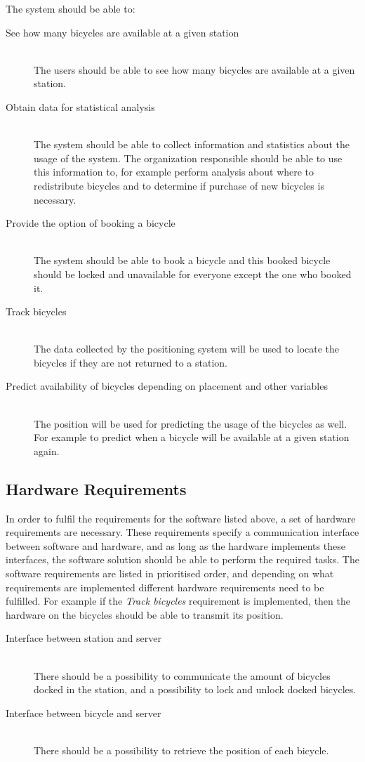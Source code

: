The system should be able to:
\begin{description}
\item[See how many bicycles are available at a given station] \hfill \\
The users should be able to see how many bicycles are available at a given station.
\item[Obtain data for statistical analysis] \hfill \\
The system should be able to collect information and statistics about the usage of the system.
The organization responsible should be able to use this information to, for example perform analysis about where to redistribute bicycles and to determine if purchase of new bicycles is necessary.
\item[Provide the option of booking a bicycle] \hfill \\
The system should be able to book a bicycle and this booked bicycle should be locked and unavailable for everyone except the one who booked it.
\item[Track bicycles] \hfill \\
The data collected by the positioning system will be used to locate the bicycles if they are not returned to a station.
\item[Predict availability of bicycles depending on placement and other variables] \hfill \\
The position will be used for predicting the usage of the bicycles as well. 
For example to predict when a bicycle will be available at a given station again.
\end{description}

\subsection{Hardware Requirements}
In order to fulfil the requirements for the software listed above, a set of hardware requirements are necessary.
These requirements specify a communication interface between software and hardware, and as long as the hardware implements these interfaces, the software solution should be able to perform the required tasks.
The software requirements are listed in prioritised order, and depending on what requirements are implemented different hardware requirements need to be fulfilled. 
For example if the \textit{Track bicycles} requirement is implemented, then the hardware on the bicycles should be able to transmit its position.
\begin{description}
	\item[Interface between station and server]\hfill \\
	There should be a possibility to communicate the amount of bicycles docked in the station, and a possibility to lock and unlock docked bicycles.
	\item[Interface between bicycle and server]\hfill \\
	There should be a possibility to retrieve the position of each bicycle.
\end{description}